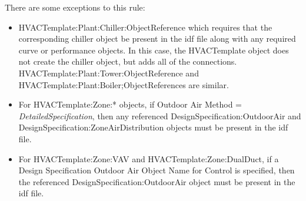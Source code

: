There are some exceptions to this rule:

\begin{itemize}
\item
  HVACTemplate:Plant:Chiller:ObjectReference which requires that the corresponding chiller object be present in the idf file along with any required curve or performance objects. In this case, the HVACTemplate object does not create the chiller object, but adds all of the connections. HVACTemplate:Plant:Tower:ObjectReference and HVACTemplate:Plant:Boiler;ObjectReferences are similar.
\item
  For HVACTemplate:Zone:* objects, if Outdoor Air Method = \emph{DetailedSpecification}, then any referenced DesignSpecification:OutdoorAir and DesignSpecification:ZoneAirDistribution objects must be present in the idf file.
\item
  For HVACTemplate:Zone:VAV and HVACTemplate:Zone:DualDuct, if a Design Specification Outdoor Air Object Name for Control is specified, then the referenced DesignSpecification:OutdoorAir object must be present in the idf file.
\end{itemize}

